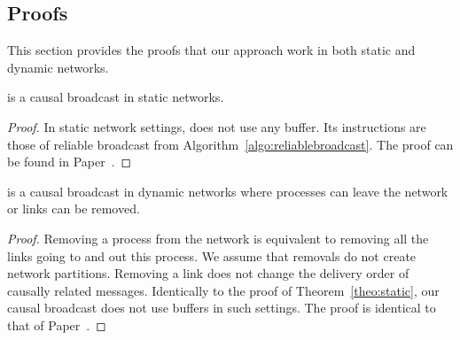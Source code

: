 
%   

\begin{figure*}
  \begin{center}
    \hspace{20pt}
    \subfloat[Part B][Meow]
    {}
  \end{center}
\end{figure*}


\subsection{Proofs}

This section provides the proofs that our approach work in both static and
dynamic networks.

\begin{theorem}
  \CBROADCAST is a causal broadcast in static networks.
\end{theorem}

\begin{proof}
  In static network settings, \CBROADCAST does not use any buffer. Its
  instructions are those of reliable broadcast from
  Algorithm~\ref{algo:reliablebroadcast}. The proof can be found in
  Paper~\cite{friedman2004causal}.
\end{proof}

\begin{lemma}
  \CBROADCAST is a causal broadcast in dynamic networks where processes can
  leave the network or links can be removed.
\end{lemma}

\begin{proof}
  Removing a process from the network is equivalent to removing all the links
  going to and out this process. We assume that removals do not create network
  partitions.  Removing a link does not change the delivery order of causally
  related messages. Identically to the proof of Theorem~\ref{theo:static}, our
  causal broadcast does not use buffers in such settings. The proof is identical
  to that of Paper~\cite{friedman2004causal}.
\end{proof}

